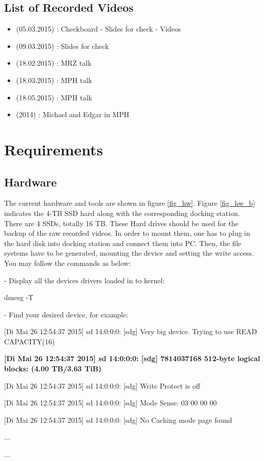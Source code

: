 \documentclass[[12pt,DIV14,BCOR12mm,a4paper,footexclude,headinclude,halfparskip-,twoside,openright,cleardoubleempty,idxtotoc,bibtotoc]{article}
\begin{document}
\subsection{List of Recorded Videos}

\begin{itemize}

\item (05.03.2015) : Checkboard - Slides for check  - Videos
\item (09.03.2015) : Slides for check 
\item (18.02.2015) : MRZ talk
\item (18.03.2015) : MPH talk
\item (18.05.2015) : MPH talk
\item (2014) : Michael and Edgar in MPH 

\end{itemize}

\section{Requirements}




\subsection{Hardware}

The current hardware and tools are shown in figure \ref{fig_hw}. 
Figure \ref{fig_hw_b} indicates the 4-TB SSD hard along with the corresponding docking station. There are 4 SSDs, totally 16 TB. These Hard drives should be used for the backup of the raw recorded videos. In order to mount them, one has to plug in the hard disk into docking station and connect them into PC. Then, the file systems have to be generated, mounting the device and setting the write access. You may follow the commands as below:

- Display all the devices drivers loaded in to kernel:

\begin{framed}
 
dmesg -T

\end{framed}

- Find your desired device, for example:

\begin{framed}

[Di Mai 26 12:54:37 2015] sd 14:0:0:0: [sdg] Very big device. Trying to use READ CAPACITY(16)

\textbf{[Di Mai 26 12:54:37 2015] sd 14:0:0:0: [sdg] 7814037168 512-byte logical blocks: (4.00 TB/3.63 TiB)}

[Di Mai 26 12:54:37 2015] sd 14:0:0:0: [sdg] Write Protect is off

[Di Mai 26 12:54:37 2015] sd 14:0:0:0: [sdg] Mode Sense: 03 00 00 00

[Di Mai 26 12:54:37 2015] sd 14:0:0:0: [sdg] No Caching mode page found

...

...

\end{framed}
\end{document}
